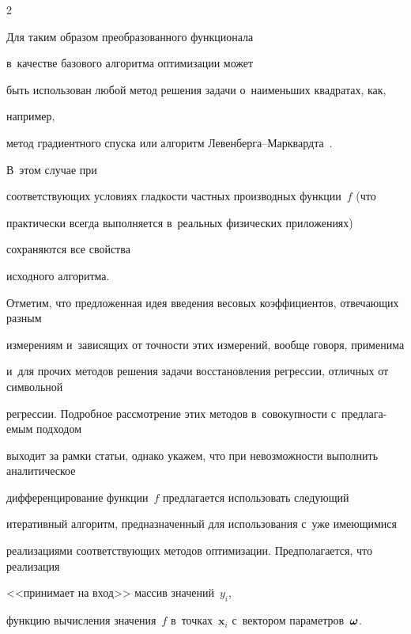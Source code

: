 \begin{multicols}{2}

Для таким образом преобразованного функционала

в~качестве базового алгоритма оптимизации может

быть использован любой метод решения зада\-чи о~наименьших квад\-ра\-тах, как, 

например,

метод градиентного спуска или алгоритм Ле\-вен\-бер\-га--Марк\-вард\-та~\cite{dlib09}.

В~этом случае при

соответствующих условиях глад\-кости частных производных функции~$f$ (что 

практически всегда выполняется в~реальных физических приложениях) 

сохраняются все свойства

исходного алгоритма.



Отметим, что предложенная идея введения весовых коэффициентов, отвечающих разным

измерениям и~зависящих от точности этих измерений, вообще говоря, применима 

и~для прочих методов решения задачи вос\-ста\-нов\-ле\-ния регрессии, отличных от символьной 

регрессии. Подробное рас\-смот\-ре\-ние этих методов в~совокупности с~предлага-\linebreak емым подходом 

выходит за рамки статьи, однако укажем, что при невозможности выполнить аналитическое

дифференцирование функции~$f$ предлагается использовать следующий

итеративный алгоритм, предназначенный для использования с~уже имеющимися

реализациями соответствующих методов оптимизации. Предполагается, что реализация

<<принимает на вход>> массив значений~$y_i$,

функцию вычисления значения~$f$ в~точках~$\mathbf{x}_i$ с~вектором па\-ра\-мет\-ров~$\boldsymbol{\omega}$.




\end{multicols}
